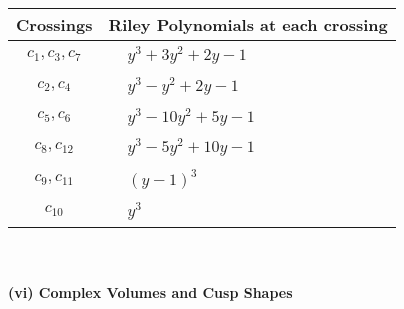 \documentclass[1p]{elsarticle_modified}
\theoremstyle{definition}
\begin{document}
\begin{tabular}{m{50pt}|m{274pt}}
Crossings & \hspace{64pt}Riley Polynomials at each crossing \\
\hline $$\begin{aligned}c_{1},c_{3},c_{7}\end{aligned}$$&$\begin{aligned}
&y^3+3 y^2+2 y-1
\end{aligned}$\\
\hline $$\begin{aligned}c_{2},c_{4}\end{aligned}$$&$\begin{aligned}
&y^3- y^2+2 y-1
\end{aligned}$\\
\hline $$\begin{aligned}c_{5},c_{6}\end{aligned}$$&$\begin{aligned}
&y^3-10 y^2+5 y-1
\end{aligned}$\\
\hline $$\begin{aligned}c_{8},c_{12}\end{aligned}$$&$\begin{aligned}
&y^3-5 y^2+10 y-1
\end{aligned}$\\
\hline $$\begin{aligned}c_{9},c_{11}\end{aligned}$$&$\begin{aligned}
&(y-1)^3
\end{aligned}$\\
\hline $$\begin{aligned}c_{10}\end{aligned}$$&$\begin{aligned}
&y^3
\end{aligned}$\\
\hline
\end{tabular}\\~\\
\newpage\flushleft \textbf{(vi) Complex Volumes and Cusp Shapes}
\end{document}
